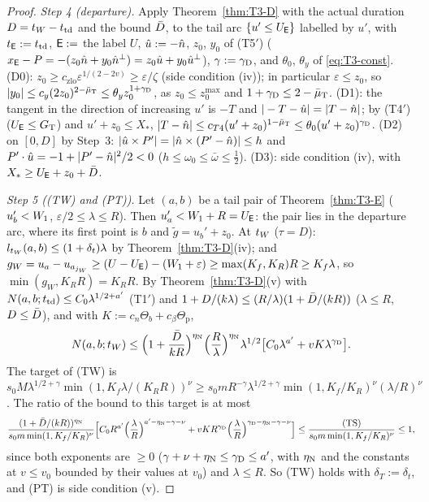 \begin{proof}
\emph{Step 4 (departure).} Apply Theorem~\ref{thm:T3-D} with the actual duration $D=t_W-t_{\mathrm{td}}$ and the bound $\bar D$, to the tail
arc $\{u'\le U_{\mathsf E}\}$ labelled by $u'$, with $t_{\mathsf E}:=t_{\mathrm{td}}$, $\mathsf E:=$ the label $U$, $\hat u:=-\hat n$, $z_0$, $y_0$ of (T5$'$)
($x_{\mathsf E}-P=-(z_0\hat n+y_0\hat n^\perp)=z_0\hat u+y_0\hat u^\perp$), $\gamma:=\gamma_{\mathrm D}$, and $\theta_0$, $\theta_y$ of \eqref{eq:T3-const}.
(D0): $z_0\ge c_{\mathrm{zlo}}\varepsilon^{1/(2-2v)}\ge\varepsilon/\zeta$ (side condition (iv)); in particular $\varepsilon\le z_0$, so
$|y_0|\le c_y(2z_0)^{2-\bar\mu_{\mathrm T}}\le\theta_yz_0^{1+\gamma_{\mathrm D}}$, as $z_0\le z_0^{\max}$ and $1+\gamma_{\mathrm D}\le2-\bar\mu_{\mathrm T}$.
(D1): the tangent in the direction of increasing $u'$ is $-T$ and $|-T-\hat u|=|T-\hat n|$; by (T4$'$) ($U_{\mathsf E}\le G_{\mathrm T}$) and
$u'+z_0\le X_*$, $|T-\hat n|\le c_{T4}(u'+z_0)^{1-\bar\mu_{\mathrm T}}\le\theta_0(u'+z_0)^{\gamma_{\mathrm D}}$. (D2) on $[0,D]$ by Step~3:
$|\hat u\times P'|=|\hat n\times(P'-\hat n)|\le h$ and $P'\cdot\hat u=-1+|P'-\hat n|^2/2<0$ ($h\le\omega_0\le\bar\omega\le\frac12$). (D3): side
condition (iv), with $X_*\ge U_{\mathsf E}+z_0+\bar D$.

\emph{Step 5 ((TW) and (PT)).} Let $(a,b)$ be a tail pair of Theorem~\ref{thm:T3-E} ($u_b'<W_1$, $\varepsilon/2\le\lambda\le R$). Then
$u_a'<W_1+R=U_{\mathsf E}$: the pair lies in the departure arc, where its first point is $b$ and $\tilde g=u_b'+z_0$. At $t_W$
($\tau=D$): $l_{t_W}(a,b)\le(1+\delta_t)\lambda$ by Theorem~\ref{thm:T3-D}(iv); and
$g_W=u_a-u_{a_{j_W}}\ge(U-U_{\mathsf E})-(W_1+\varepsilon)\ge\max(K_f,K_R)R\ge K_f\lambda$, so $\min(g_W,K_RR)=K_RR$. By
Theorem~\ref{thm:T3-D}(v) with $N(a,b;t_{\mathrm{td}})\le C_0\lambda^{1/2+a'}$ (T1$'$) and
$1+D/(k\lambda)\le(R/\lambda)(1+\bar D/(kR))$ ($\lambda\le R$, $D\le\bar D$), and with $K:=c_n\Theta_b+c_\beta\Theta_{\mathrm p}$,
\[
N(a,b;t_W)\le\Bigl(1+\frac{\bar D}{kR}\Bigr)^{\eta_{\mathrm N}}\Bigl(\frac R\lambda\Bigr)^{\eta_{\mathrm N}}\lambda^{1/2}\bigl[C_0\lambda^{a'}+vK\lambda^{\gamma_{\mathrm D}}\bigr].
\]
The target of (TW) is $s_0M\lambda^{1/2+\gamma}\min(1,K_f\lambda/(K_RR))^\nu\ge s_0mR^{-\gamma}\lambda^{1/2+\gamma}\min(1,K_f/K_R)^\nu(\lambda/R)^\nu$.
The ratio of the bound to this target is at most
\[
\frac{(1+\bar D/(kR))^{\eta_{\mathrm N}}}{s_0m\min(1,K_f/K_R)^\nu}\Bigl[C_0R^{a'}\Bigl(\frac\lambda R\Bigr)^{a'-\eta_{\mathrm N}-\gamma-\nu}
+vKR^{\gamma_{\mathrm D}}\Bigl(\frac\lambda R\Bigr)^{\gamma_{\mathrm D}-\eta_{\mathrm N}-\gamma-\nu}\Bigr]\le\frac{\textup{(TS)}}{s_0m\min(1,K_f/K_R)^\nu}\le1,
\]
since both exponents are $\ge0$ ($\gamma+\nu+\eta_{\mathrm N}\le\gamma_{\mathrm D}\le a'$, with $\eta_{\mathrm N}$ and the constants at $v\le v_0$ bounded by their
values at $v_0$) and $\lambda\le R$. So (TW) holds with $\delta_T:=\delta_t$, and (PT) is side condition (v).


\end{proof}
